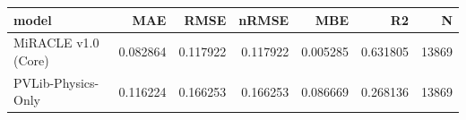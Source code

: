 \begin{tabular}{lrrrrrr}
\toprule
model & MAE & RMSE & nRMSE & MBE & R2 & N \\
\midrule
MiRACLE v1.0 (Core) & 0.082864 & 0.117922 & 0.117922 & 0.005285 & 0.631805 & 13869 \\
PVLib-Physics-Only & 0.116224 & 0.166253 & 0.166253 & 0.086669 & 0.268136 & 13869 \\
\bottomrule
\end{tabular}
